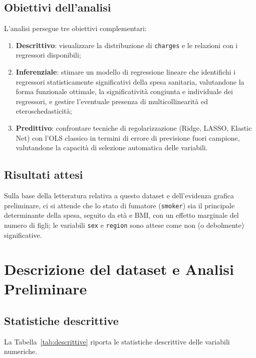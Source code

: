 \documentclass[11pt,a4paper]{article}
\begin{document}
\subsection{Obiettivi dell'analisi}
L'analisi persegue tre obiettivi complementari:
\begin{enumerate}[nosep]
    \item \textbf{Descrittivo}: visualizzare la distribuzione di \texttt{charges}
    e le relazioni con i regressori disponibili;
    \item \textbf{Inferenziale}: stimare un modello di regressione lineare che
    identifichi i regressori statisticamente significativi della spesa
    sanitaria, valutandone la forma funzionale ottimale, la significatività
    congiunta e individuale dei regressori, e gestire l'eventuale presenza di multicollinearità
    ed eteroschedasticità;
    \item \textbf{Predittivo}: confrontare tecniche di regolarizzazione
    (Ridge, LASSO, Elastic Net) con l'OLS classico in termini di errore di
    previsione fuori campione, valutandone la capacità di selezione automatica
    delle variabili.
\end{enumerate}

\subsection{Risultati attesi}
Sulla base della letteratura relativa a questo dataset e dell'evidenza
grafica preliminare, ci si attende che lo stato di fumatore (\texttt{smoker})
sia il principale determinante della spesa, seguito da età e BMI, con un
effetto marginale del numero di figli; le variabili \texttt{sex} e
\texttt{region} sono attese come non (o debolmente) significative.

\section{Descrizione del dataset e Analisi Preliminare}

\subsection{Statistiche descrittive}
La Tabella~\ref{tab:descrittive} riporta le statistiche descrittive delle
variabili numeriche.
\end{document}

